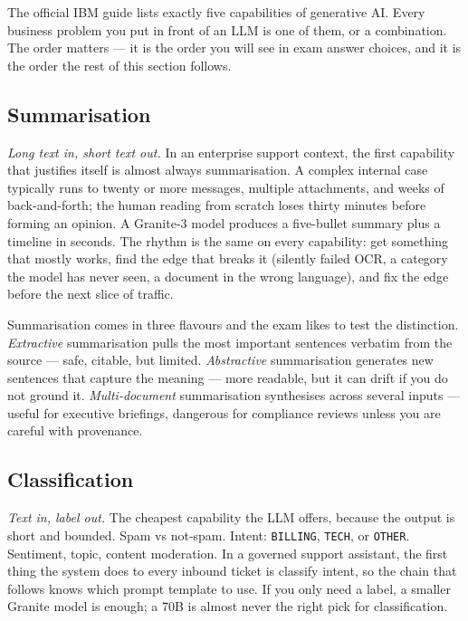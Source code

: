The official IBM guide lists exactly five capabilities of generative AI. Every business problem you put in front of an LLM is one of them, or a combination. The order matters --- it is the order you will see in exam answer choices, and it is the order the rest of this section follows.

\subsection{Summarisation}

\emph{Long text in, short text out.} In an enterprise support context, the first capability that justifies itself is almost always summarisation. A complex internal case typically runs to twenty or more messages, multiple attachments, and weeks of back-and-forth; the human reading from scratch loses thirty minutes before forming an opinion. A Granite-3 model produces a five-bullet summary plus a timeline in seconds. The rhythm is the same on every capability: get something that mostly works, find the edge that breaks it (silently failed OCR, a category the model has never seen, a document in the wrong language), and fix the edge before the next slice of traffic.

Summarisation comes in three flavours and the exam likes to test the distinction. \emph{Extractive} summarisation pulls the most important sentences verbatim from the source --- safe, citable, but limited. \emph{Abstractive} summarisation generates new sentences that capture the meaning --- more readable, but it can drift if you do not ground it. \emph{Multi-document} summarisation synthesises across several inputs --- useful for executive briefings, dangerous for compliance reviews unless you are careful with provenance.

\subsection{Classification}

\emph{Text in, label out.} The cheapest capability the LLM offers, because the output is short and bounded. Spam vs not-spam. Intent: \texttt{BILLING}, \texttt{TECH}, or \texttt{OTHER}. Sentiment, topic, content moderation. In a governed support assistant, the first thing the system does to every inbound ticket is classify intent, so the chain that follows knows which prompt template to use. If you only need a label, a smaller Granite model is enough; a 70B is almost never the right pick for classification.

